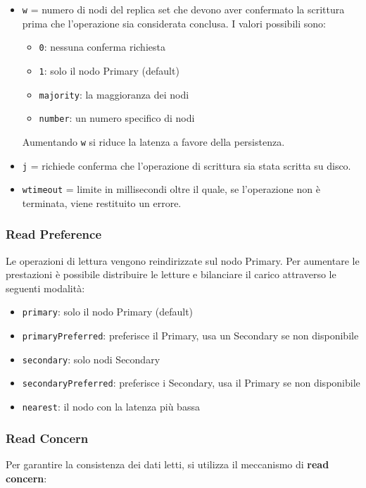 \begin{itemize}
	\item \texttt{w} = numero di nodi del replica set che devono aver confermato la scrittura prima che l'operazione sia considerata conclusa. I valori possibili sono:
	\begin{itemize}
		\item \texttt{0}: nessuna conferma richiesta
		\item \texttt{1}: solo il nodo Primary (default)
		\item \texttt{majority}: la maggioranza dei nodi
		\item \texttt{number}: un numero specifico di nodi
	\end{itemize}
	Aumentando \texttt{w} si riduce la latenza a favore della persistenza.
	\item \texttt{j} = richiede conferma che l'operazione di scrittura sia stata scritta su disco.
	\item \texttt{wtimeout} = limite in millisecondi oltre il quale, se l'operazione non è terminata, viene restituito un errore.
\end{itemize}

\subsubsection*{Read Preference}

Le operazioni di lettura vengono reindirizzate sul nodo Primary. Per aumentare le prestazioni è possibile distribuire le letture e bilanciare il carico attraverso le seguenti modalità:

\begin{itemize}
	\item \texttt{primary}: solo il nodo Primary (default)
	\item \texttt{primaryPreferred}: preferisce il Primary, usa un Secondary se non disponibile
	\item \texttt{secondary}: solo nodi Secondary
	\item \texttt{secondaryPreferred}: preferisce i Secondary, usa il Primary se non disponibile
	\item \texttt{nearest}: il nodo con la latenza più bassa
\end{itemize}

\subsubsection*{Read Concern}

Per garantire la consistenza dei dati letti, si utilizza il meccanismo di \textbf{read concern}:

